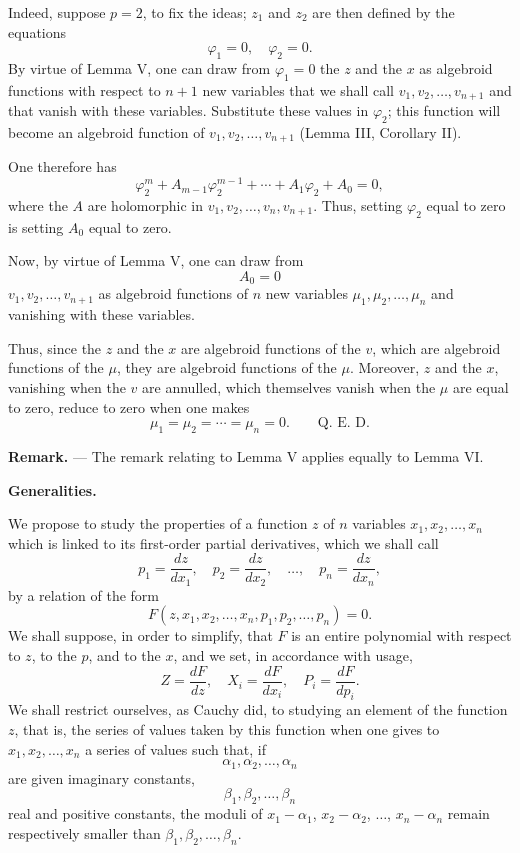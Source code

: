\documentclass[11pt]{article}
\begin{document}
Indeed, suppose $p=2$, to fix the ideas; $z_1$ and $z_2$ are then defined by the equations
\[
\varphi_1=0,
\quad \varphi_2=0.
\]
By virtue of Lemma V, one can draw from $\varphi_1=0$ the $z$ and the $x$ as algebroid functions with respect to $n+1$ new variables that we shall call $v_1,v_2,\ldots,v_{n+1}$ and that vanish with these variables. Substitute these values in $\varphi_2$; this function will become an algebroid function of $v_1,v_2,\ldots,v_{n+1}$ (Lemma III, Corollary II).

One therefore has
\[
\varphi_2^m+A_{m-1}\varphi_2^{m-1}+\cdots+A_1\varphi_2+A_0=0,
\]
where the $A$ are holomorphic in $v_1,v_2,\ldots,v_n,v_{n+1}$. Thus, setting $\varphi_2$ equal to zero is setting $A_0$ equal to zero.

Now, by virtue of Lemma V, one can draw from
\[
A_0=0
\]
$v_1,v_2,\ldots,v_{n+1}$ as algebroid functions of $n$ new variables $\mu_1,\mu_2,\ldots,\mu_n$ and vanishing with these variables.

Thus, since the $z$ and the $x$ are algebroid functions of the $v$, which are algebroid functions of the $\mu$, they are algebroid functions of the $\mu$. Moreover, $z$ and the $x$, vanishing when the $v$ are annulled, which themselves vanish when the $\mu$ are equal to zero, reduce to zero when one makes
\[
\mu_1=\mu_2=\cdots=\mu_n=0. \qquad \text{Q. E. D.}
\]

\medskip
\noindent\textbf{Remark.} — The remark relating to Lemma V applies equally to Lemma VI.

\begin{center}
\textbf{Generalities.}
\end{center}

We propose to study the properties of a function $z$ of $n$ variables $x_1,x_2,\ldots,x_n$ which is linked to its first-order partial derivatives, which we shall call
\[
p_1=\frac{dz}{dx_1},
\quad p_2=\frac{dz}{dx_2},
\quad \ldots,
\quad p_n=\frac{dz}{dx_n},
\]
by a relation of the form
\[
F(z,x_1,x_2,\ldots,x_n,p_1,p_2,\ldots,p_n)=0.
\]
We shall suppose, in order to simplify, that $F$ is an entire polynomial with respect to $z$, to the $p$, and to the $x$, and we set, in accordance with usage,
\[
Z=\frac{dF}{dz},
\quad X_i=\frac{dF}{dx_i},
\quad P_i=\frac{dF}{dp_i}.
\]
We shall restrict ourselves, as Cauchy did, to studying an element of the function $z$, that is, the series of values taken by this function when one gives to $x_1,x_2,\ldots,x_n$ a series of values such that, if
\[
\alpha_1,\alpha_2,\ldots,\alpha_n
\]
are given imaginary constants,
\[
\beta_1,\beta_2,\ldots,\beta_n
\]
real and positive constants, the moduli of $x_1-\alpha_1$, $x_2-\alpha_2$, $\ldots$, $x_n-\alpha_n$ remain respectively smaller than $\beta_1,\beta_2,\ldots,\beta_n$.
\end{document}
